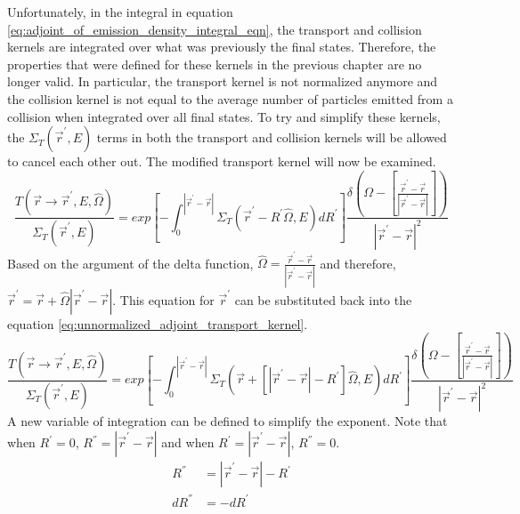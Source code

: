 Unfortunately, in the integral in equation 
\ref{eq:adjoint_of_emission_density_integral_eqn}, the transport and collision 
kernels are integrated over what was previously the final states. Therefore,
the properties that were defined for these kernels in the previous chapter are 
no longer valid. In particular, the transport kernel is not normalized anymore
and the collision kernel is not equal to the average number of particles 
emitted from a collision when integrated over all final states. To try and 
simplify these kernels, the $\Sigma_T(\vec{r}^{'},E)$ terms  in both the 
transport and collision kernels will be allowed to cancel each other out. The 
modified transport kernel will now be examined.
\begin{equation}
  \frac{T(\vec{r} \to \vec{r}^{'},E,\hat{\Omega})}{\Sigma_T(\vec{r}^{'},E)} = 
  exp\left[-\int_0^{|\vec{r}^{'} - \vec{r}|} 
    \Sigma_T(\vec{r}^{'} - R^{'} \hat{\Omega},E)dR^{'} \right]
  \frac{\delta \left(\Omega - \left[\frac{\vec{r}^{'} - \vec{r}}
      {|\vec{r}^{'} - \vec{r}|}\right]\right)}
       {|\vec{r}^{'} - \vec{r}|^2}
  \label{eq:unnormalized_adjoint_transport_kernel}
\end{equation}
Based on the argument of the delta function, 
$\hat{\Omega} = \frac{\vec{r}^{'} - \vec{r}}{|\vec{r}^{'} - \vec{r}|}$ and 
therefore, $\vec{r}^{'} = \vec{r} + \hat{\Omega}|\vec{r}^{'} - \vec{r}|$. This
equation for $\vec{r}^{'}$ can be substituted back into the equation
\ref{eq:unnormalized_adjoint_transport_kernel}.
\begin{equation*}
  \frac{T(\vec{r} \to \vec{r}^{'},E,\hat{\Omega})}{\Sigma_T(\vec{r}^{'},E)} = 
  exp\left[-\int_0^{|\vec{r}^{'} - \vec{r}|} 
    \Sigma_T \left(\vec{r} + \left[|\vec{r}^{'} - \vec{r}| - R^{'} \right] 
    \hat{\Omega},E \right) dR^{'} 
    \right] \frac{\delta \left(\Omega - \left[\frac{\vec{r}^{'} - \vec{r}}
      {|\vec{r}^{'} - \vec{r}|}\right]\right)}
       {|\vec{r}^{'} - \vec{r}|^2}
\end{equation*}
A new variable of integration can be defined to simplify the exponent. Note
that when $R^{'} = 0$, $R^{''} = |\vec{r}^{'} - \vec{r}|$ and when 
$R^{'} = |\vec{r}^{'} - \vec{r}|$, $R^{''} = 0$.
\begin{align}
  R^{''} & = |\vec{r}^{'} - \vec{r}| - R^{'} \nonumber \\
  dR^{''} & = -dR^{'} \nonumber 
\end{align}
